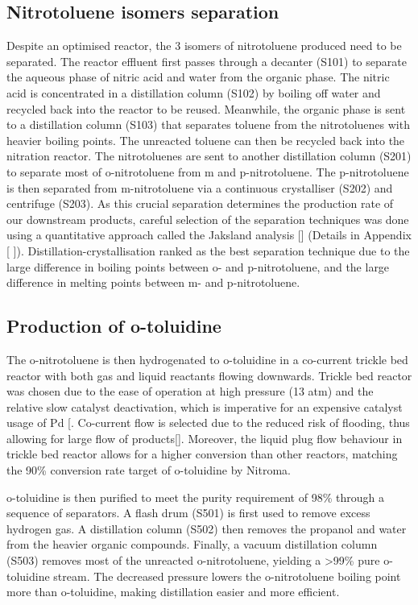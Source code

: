 \subsection{Nitrotoluene isomers separation}
Despite an optimised reactor, the 3 isomers of nitrotoluene produced need to be separated. The reactor effluent first passes through a decanter (S101) to separate the aqueous phase of nitric acid and water from the organic phase. The nitric acid is concentrated in a distillation column (S102) by boiling off water and recycled back into the reactor to be reused. Meanwhile, the organic phase is sent to a distillation column (S103) that separates toluene from the nitrotoluenes with heavier boiling points. The unreacted toluene can then be recycled back into the nitration reactor. The nitrotoluenes are sent to another distillation column (S201) to separate most of o-nitrotoluene from m and p-nitrotoluene. The p-nitrotoluene is then separated from m-nitrotoluene via a continuous crystalliser (S202) and centrifuge (S203). As this crucial separation determines the production rate of our downstream products, careful selection of the separation techniques was done using a quantitative approach called the Jaksland analysis [] (Details in Appendix [ ]). Distillation-crystallisation ranked as the best separation technique due to the large difference in boiling points between o- and p-nitrotoluene, and the large difference in melting points between m- and p-nitrotoluene.

\subsection{Production of o-toluidine}
The o-nitrotoluene is then hydrogenated to o-toluidine in a co-current trickle bed reactor with both gas and liquid reactants flowing downwards. Trickle bed reactor was chosen due to the ease of operation at high pressure (13 atm) and the relative slow catalyst deactivation, which is imperative for an expensive catalyst usage of Pd [\cite{vemala_hydrodynamic_nodate}. Co-current flow is selected due to the reduced risk of flooding, thus allowing for large flow of products[]. Moreover, the liquid plug flow behaviour in trickle bed reactor allows for a higher conversion than other reactors, matching the 90\% conversion rate target of o-toluidine by Nitroma. 

o-toluidine is then purified to meet the purity requirement of 98\% through a sequence of separators. A flash drum (S501) is first used to remove excess hydrogen gas. A distillation column (S502) then removes the propanol and water from the heavier organic compounds. Finally, a vacuum distillation column (S503) removes most of the unreacted o-nitrotoluene, yielding a >99\% pure o-toluidine stream. The decreased pressure lowers the o-nitrotoluene boiling point more than o-toluidine, making distillation easier and more efficient.  
 
